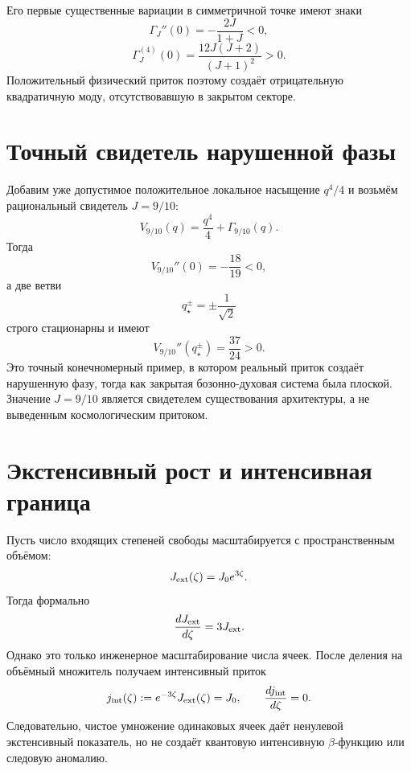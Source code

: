 Его первые существенные вариации в симметричной точке имеют знаки
\begin{equation}
 \Gamma_J''(0)=-\frac{2J}{1+J}<0,
 \label{eq:v10-inflow-negative-curvature}
\end{equation}
\begin{equation}
 \Gamma_J^{(4)}(0)
 =\frac{12J(J+2)}{(J+1)^2}>0.
 \label{eq:v10-inflow-positive-fourth}
\end{equation}
Положительный физический приток поэтому создаёт отрицательную квадратичную
моду, отсутствовавшую в закрытом секторе.

\section{Точный свидетель нарушенной фазы}

Добавим уже допустимое положительное локальное насыщение $q^4/4$ и возьмём
рациональный свидетель $J=9/10$:
\begin{equation}
 V_{9/10}(q)=\frac{q^4}{4}+\Gamma_{9/10}(q).
 \label{eq:v10-inflow-witness-potential}
\end{equation}
Тогда
\begin{equation}
 V_{9/10}''(0)=-\frac{18}{19}<0,
 \label{eq:v10-inflow-witness-origin-hessian}
\end{equation}
а две ветви
\begin{equation}
 q_\star^\pm=\pm\frac{1}{\sqrt2}
 \label{eq:v10-inflow-broken-points}
\end{equation}
строго стационарны и имеют
\begin{equation}
 V_{9/10}''(q_\star^\pm)=\frac{37}{24}>0.
 \label{eq:v10-inflow-broken-hessian}
\end{equation}
Это точный конечномерный пример, в котором реальный приток создаёт
нарушенную фазу, тогда как закрытая бозонно-духовая система была плоской.
Значение $J=9/10$ является свидетелем существования архитектуры, а не
выведенным космологическим притоком.

\section{Экстенсивный рост и интенсивная граница}

Пусть число входящих степеней свободы масштабируется с пространственным
объёмом:
\begin{equation}
 J_{\rm ext}(\zeta)=J_0e^{3\zeta}.
 \label{eq:v10-inflow-extensive-current}
\end{equation}
Тогда формально
\begin{equation}
 \frac{dJ_{\rm ext}}{d\zeta}=3J_{\rm ext}.
 \label{eq:v10-inflow-extensive-beta}
\end{equation}
Однако это только инженерное масштабирование числа ячеек. После деления на
объёмный множитель получаем интенсивный приток
\begin{equation}
 j_{\rm int}(\zeta)
 :=e^{-3\zeta}J_{\rm ext}(\zeta)=J_0,
 \qquad
 \frac{dj_{\rm int}}{d\zeta}=0.
 \label{eq:v10-inflow-intensive-beta-zero}
\end{equation}
Следовательно, чистое умножение одинаковых ячеек даёт ненулевой
экстенсивный показатель, но не создаёт квантовую интенсивную
$\beta$-функцию или следовую аномалию.


